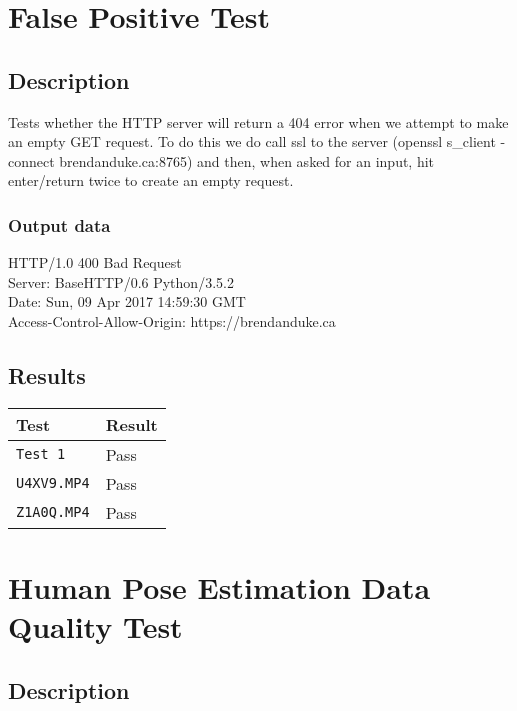 \documentclass{scrreprt}
\begin{document}
\section{False Positive Test}
\subsection{Description}

Tests whether the HTTP server will return a 404 error when we attempt to make an empty GET request. To do this we do call ssl to the server (openssl s_client -connect brendanduke.ca:8765) and then, when asked for an input, hit enter/return twice to create an empty request.

\subsubsection{Output data}
HTTP/1.0 400 Bad Request \\
Server: BaseHTTP/0.6 Python/3.5.2 \\
Date: Sun, 09 Apr 2017 14:59:30 GMT \\
Access-Control-Allow-Origin: https://brendanduke.ca \\

\subsection{Results}

\begin{table}[H]
        \centering
        \begin{tabular}{||p{2.5cm}|p{2.5cm}||}
                \hline
                \textbf Test & \textbf Result\\
                \hline\hline
                \verb|Test 1|  &  Pass\\ %
                \hline
                \verb|U4XV9.MP4|  &  Pass\\
                \hline
                \verb|Z1A0Q.MP4| & Pass\\
                \hline
        \end{tabular}
\end{table}

\section{Human Pose Estimation Data Quality Test}
\subsection{Description}
\end{document}
